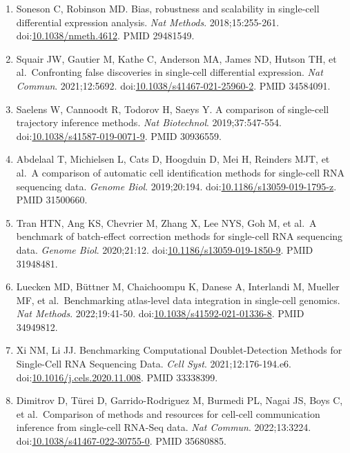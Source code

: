 \documentclass[11pt]{article}
\begin{document}
\begin{enumerate}
  PMID 30271584.
\item
  Soneson C, Robinson MD. Bias, robustness and scalability in
  single-cell differential expression analysis. \emph{Nat Methods}.
  2018;15:255-261.
  doi:\href{https://doi.org/10.1038/nmeth.4612}{10.1038/nmeth.4612}.
  PMID 29481549.
\item
  Squair JW, Gautier M, Kathe C, Anderson MA, James ND, Hutson TH, et
  al.~Confronting false discoveries in single-cell differential
  expression. \emph{Nat Commun}. 2021;12:5692.
  doi:\href{https://doi.org/10.1038/s41467-021-25960-2}{10.1038/s41467-021-25960-2}.
  PMID 34584091.
\item
  Saelens W, Cannoodt R, Todorov H, Saeys Y. A comparison of single-cell
  trajectory inference methods. \emph{Nat Biotechnol}. 2019;37:547-554.
  doi:\href{https://doi.org/10.1038/s41587-019-0071-9}{10.1038/s41587-019-0071-9}.
  PMID 30936559.
\item
  Abdelaal T, Michielsen L, Cats D, Hoogduin D, Mei H, Reinders MJT, et
  al.~A comparison of automatic cell identification methods for
  single-cell RNA sequencing data. \emph{Genome Biol}. 2019;20:194.
  doi:\href{https://doi.org/10.1186/s13059-019-1795-z}{10.1186/s13059-019-1795-z}.
  PMID 31500660.
\item
  Tran HTN, Ang KS, Chevrier M, Zhang X, Lee NYS, Goh M, et al.~A
  benchmark of batch-effect correction methods for single-cell RNA
  sequencing data. \emph{Genome Biol}. 2020;21:12.
  doi:\href{https://doi.org/10.1186/s13059-019-1850-9}{10.1186/s13059-019-1850-9}.
  PMID 31948481.
\item
  Luecken MD, Büttner M, Chaichoompu K, Danese A, Interlandi M, Mueller
  MF, et al.~Benchmarking atlas-level data integration in single-cell
  genomics. \emph{Nat Methods}. 2022;19:41-50.
  doi:\href{https://doi.org/10.1038/s41592-021-01336-8}{10.1038/s41592-021-01336-8}.
  PMID 34949812.
\item
  Xi NM, Li JJ. Benchmarking Computational Doublet-Detection Methods for
  Single-Cell RNA Sequencing Data. \emph{Cell Syst}. 2021;12:176-194.e6.
  doi:\href{https://doi.org/10.1016/j.cels.2020.11.008}{10.1016/j.cels.2020.11.008}.
  PMID 33338399.
\item
  Dimitrov D, Türei D, Garrido-Rodriguez M, Burmedi PL, Nagai JS, Boys
  C, et al.~Comparison of methods and resources for cell-cell
  communication inference from single-cell RNA-Seq data. \emph{Nat
  Commun}. 2022;13:3224.
  doi:\href{https://doi.org/10.1038/s41467-022-30755-0}{10.1038/s41467-022-30755-0}.
  PMID 35680885.

\end{enumerate}
\end{document}
